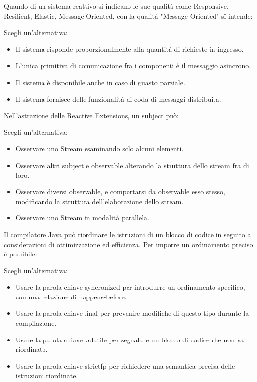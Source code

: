 \documentclass{article}
\begin{document}
Quando di un sistema reattivo si indicano le sue qualità come Responsive, Resilient, Elastic, Message-Oriented, con la qualità "Message-Oriented" sî intende:

Scegli un'alternativa: 
\begin{itemize}
	\item Il sistema risponde proporzionalmente alla quantità di richieste in ingresso.
	\item \checkmark L'unica primitiva di comunicazione fra i componenti è il messaggio asincrono. 
	\item Il sistema è disponibile anche in caso di guasto parziale.
	\item Il sistema fornisce delle funzionalità di coda di messaggi distribuita.
\end{itemize}

Nell'astrazione delle Reactive Extensions, un subject può:

Scegli un'alternativa: 

\begin{itemize}
	\item Osservare uno Stream esaminando solo alcuni elementi.
	\item Osservare altri subject e observable alterando la struttura dello stream fra di loro.
	\item \checkmark Osservare diversi observable, e comportarsi da observable esso stesso, modificando la struttura dell'elaborazione dello stream.
	\item Osservare uno Stream in modalità parallela.
\end{itemize}

Il compilatore Java può riordinare le istruzioni di un blocco di codice in seguito a considerazioni di ottimizzazione ed efficienza. Per imporre un ordinamento preciso è
possibile:

Scegli un'alternativa: 
\begin{itemize}
	\item \checkmark Usare la parola chiave syncronized per introdurre un ordinamento specifico, con una relazione di happens-before.
	\item Usare la parola chiave final per prevenire modifiche di questo tipo durante la compilazione.
	\item Usare la parola chiave volatile per segnalare un blocco di codice che non va riordinato.
	\item Usare la parola chiave strictfp per richiedere una semantica precisa delle istruzioni riordinate.
\end{itemize}
\end{document}
